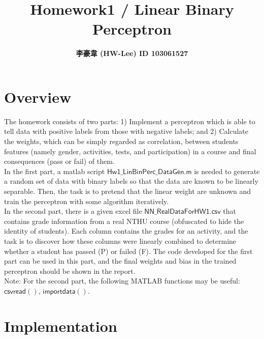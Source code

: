 \documentclass[12pt]{article}
\title{\textbf{Homework1 / Linear Binary Perceptron}}
\author{\textbf{李豪韋 (HW-Lee) ID 103061527}}
\date{}
\begin{document}
\vspace*{-60pt}
    {\let\newpage\relax\maketitle}

\section*{Overview}
\vspace{-20pt}
\noindent\makebox[\linewidth]{\rule{\textwidth}{0.4pt}}
\vspace{5pt}

The homework consists of two parts: 1) Implement a perceptron which is able to tell data with positive labels from those with negative labels; and 2) Calculate the weights, which can be simply regarded as correlation, between students features (namely gender, activities, tests, and participation) in a course and final consequences (pass or fail) of them. \\

In the first part, a matlab script $\mathsf{Hw1\_LinBinPerc\_DataGen.m}$ is needed to generate a random set of data with binary labels so that the data are known to be linearly separable. Then, the task is to pretend that the linear weight are unknown and train the perceptron with some algorithm iteratively. \\

In the second part, there is a given excel file $\mathsf{NN\_RealDataForHW1.csv}$ that contains grade information from a real NTHU course (obfuscated to hide the identity of students). Each column contains the grades for an activity, and the task is to discover how these columns were linearly combined to determine whether a student has passed (P) or failed (F). The code developed for the first part can be used in this part, and the final weights and bias in the trained perceptron should be shown in the report. \\

Note: For the second part, the following MATLAB functions may be useful: $\mathsf{csvread()}$, $\mathsf{importdata()}$. \\

\section*{Implementation}
\vspace{-20pt}
\noindent\makebox[\linewidth]{\rule{\textwidth}{0.4pt}}
\end{document}
